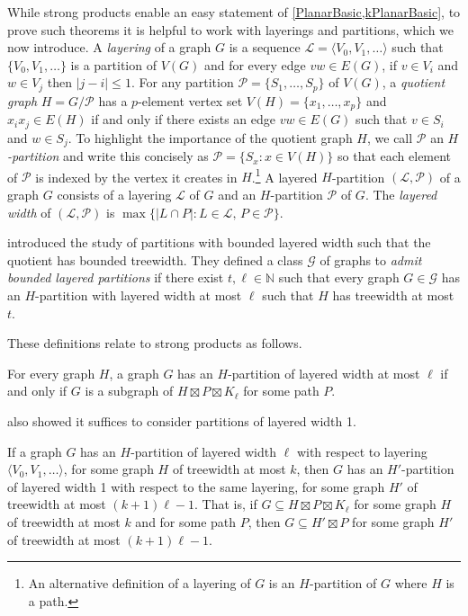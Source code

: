 \documentclass{patmorin}
\renewcommand{\leq}{\leqslant}
\begin{document}
While strong products enable an easy statement of \cref{PlanarBasic,kPlanarBasic}, to prove such theorems it is helpful to work with layerings and partitions, which we now introduce. A \emph{layering} of a graph $G$ is a sequence $\mathcal{L}=\langle V_0,V_1,\ldots\rangle$ such that $\{V_0,V_1,\ldots\}$ is a partition of $V(G)$ and for every edge $vw\in E(G)$, if $v\in V_i$ and $w\in V_j$ then $|j-i|\leq 1$.  For any partition $\mathcal{P}=\{S_1,\ldots,S_p\}$ of $V(G)$, a \emph{quotient graph} $H=G/\mathcal{P}$ has a $p$-element vertex set $V(H)=\{x_1,\ldots,x_p\}$ and $x_ix_j\in E(H)$ if and only if there exists an edge $vw\in E(G)$ such that $v\in S_i$ and $w\in S_j$. To highlight the importance of the quotient graph $H$, we call $\mathcal{P}$ an \emph{$H$-partition} and write this concisely as $\mathcal{P}=\{S_x : x\in V(H)\}$ so that each element of $\mathcal{P}$ is indexed by the vertex it creates in $H$.\footnote{An alternative definition of a layering of $G$ is an $H$-partition of $G$ where $H$ is a path.}  A layered $H$-partition $(\mathcal{L},\mathcal{P})$ of a graph $G$ consists of a layering $\mathcal{L}$ of $G$ and an $H$-partition $\mathcal{P}$ of $G$. The \emph{layered width} of $(\mathcal{L},\mathcal{P})$ is $\max\{|L\cap P|: L\in\mathcal{L},\, P\in\mathcal{P}\}$. 

\citet{dujmovic.joret.ea:planar} introduced the study of partitions with bounded layered width such that the quotient has bounded treewidth. They defined a class $\mathcal{G}$ of graphs to \emph{admit bounded layered partitions} if there exist $t,\ell\in\mathbb{N}$ such that every graph $G\in \mathcal{G}$ has an $H$-partition with layered width at most $\ell$ such that $H$ has treewidth at most $t$. 

These definitions relate to strong products as follows. 

\begin{lem} 
\label{PartitionProduct}
For every graph $H$, a graph $G$ has an $H$-partition of layered width at most $\ell$ if and only if $G$ is a subgraph of 
$H \boxtimes P \boxtimes K_\ell$ for some path $P$.
\end{lem}

\citet{dujmovic.joret.ea:planar} also showed it suffices to consider partitions of layered width 1.

\begin{lem} 
\label{MakeWidth1}
If a graph $G$ has an $H$-partition of layered width $\ell$ with respect to layering $\langle V_0,V_1,\dots\rangle$, for some graph $H$ of treewidth at most $k$, then $G$ has an $H'$-partition of layered width 1 with respect to the same layering, for some graph $H'$ of treewidth at most $(k+1)\ell-1$.  That is, if $G\subseteq H\boxtimes P\boxtimes K_\ell$ for some graph $H$ of treewidth at most $k$  and for some path $P$, then $G\subseteq H' \boxtimes P$ for some graph $H'$ of treewidth at most $(k+1)\ell-1$.
\end{lem}
\end{document}

